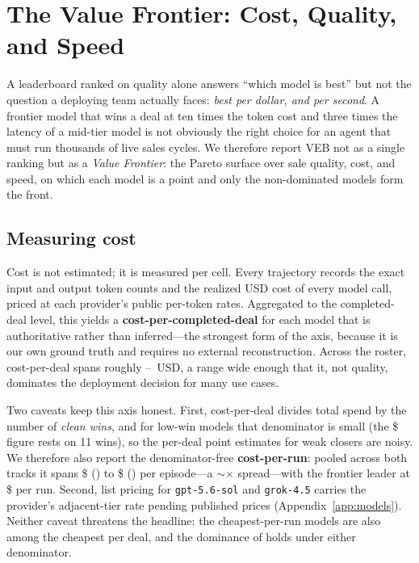 \section{The Value Frontier: Cost, Quality, and Speed}
\label{sec:frontier}

A leaderboard ranked on quality alone answers ``which model is best'' but not the
question a deploying team actually faces: \emph{best per dollar, and per second}.
A frontier model that wins a deal at ten times the token cost and three times the
latency of a mid-tier model is not obviously the right choice for an agent that
must run thousands of live sales cycles. We therefore report VEB not as a single
ranking but as a \emph{Value Frontier}: the Pareto surface over sale quality, cost,
and speed, on which each model is a point and only the non-dominated models form
the front.

\subsection{Measuring cost}
Cost is not estimated; it is measured per cell. Every trajectory records the exact
input and output token counts and the realized USD cost of every model call, priced
at each provider's public per-token rates. Aggregated to the completed-deal level,
this yields a \textbf{cost-per-completed-deal} for each model that is authoritative
rather than inferred---the strongest form of the axis, because it is our own ground
truth and requires no external reconstruction. Across the roster, cost-per-deal
spans roughly \resCostPerDealMin{}--\resCostPerDealMax{}~USD, a range wide enough
that it, not quality, dominates the deployment decision for many use cases.

Two caveats keep this axis honest. First, cost-per-deal divides total spend by the
number of \emph{clean wins}, and for low-win models that denominator is small (the
\$\resCostPerDealMax{} figure rests on 11 wins), so the per-deal point estimates
for weak closers are noisy. We therefore also report the denominator-free
\textbf{cost-per-run}: pooled across both tracks it spans \$\resCostPerRunMin{}
(\resCostPerRunMinModel{}) to \$\resCostPerRunMax{} (\resCostPerRunMaxModel{}) per
episode---a $\sim$\resCostPerRunSpread$\times$
spread---with the frontier leader \resFrontierBest{} at
\$\resFrontierBestCostPerRun{} per run. Second,
list pricing for \texttt{gpt-5.6-sol} and \texttt{grok-4.5} carries the
provider's adjacent-tier rate pending published prices
(Appendix~\ref{app:models}). Neither caveat threatens the headline: the
cheapest-per-run models are also among the cheapest per deal, and the dominance
of \resFrontierBest{} holds under either denominator.

